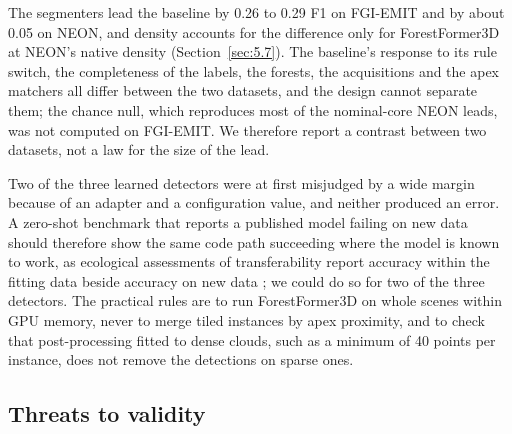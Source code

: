\documentclass[preprint,12pt,authoryear,a4paper]{elsarticle}
\begin{document}
The segmenters lead the baseline by 0.26 to 0.29 F1 on FGI-EMIT and by about
0.05 on NEON, and density accounts for the difference only for ForestFormer3D at
NEON's native density (Section~\ref{sec:5.7}). The baseline's response to its rule switch,
the completeness of the labels, the forests, the acquisitions and the apex
matchers all differ between the two datasets, and the design cannot separate
them; the chance null, which reproduces most of the nominal-core NEON leads, was
not computed on FGI-EMIT. We therefore report a contrast between two datasets,
not a law for the size of the lead.

Two of the three learned detectors were at first misjudged by a wide margin
because of an adapter and a configuration value, and neither produced an error.
A zero-shot benchmark that reports a published model failing on new data should
therefore show the same code path succeeding where the model is known to work,
as ecological assessments of transferability report accuracy within the fitting
data beside accuracy on new data \citep{wenger2012assessing,yates2018outstanding};
we could do so for two of the three detectors. The practical rules are to run
ForestFormer3D on whole scenes within GPU memory, never to merge tiled instances
by apex proximity, and to check that post-processing fitted to dense clouds,
such as a minimum of 40 points per instance, does not remove the detections on
sparse ones.

\subsection{Threats to validity}\label{sec:6.4}
\end{document}
